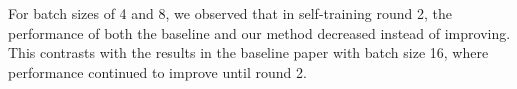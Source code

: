 For batch sizes of 4 and 8, we observed that in self-training round 2, the performance of both the baseline and our method decreased instead of improving. This contrasts with the results in the baseline paper with batch size 16, where performance continued to improve until round 2.

%
